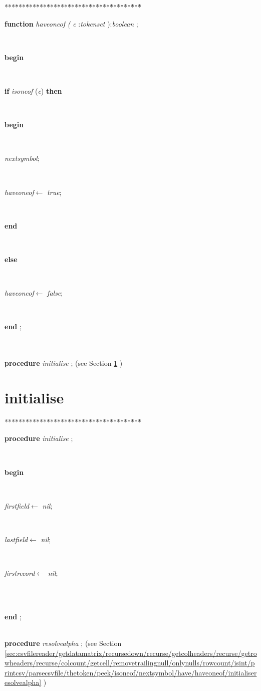 \begin{tabbing}
***\=***\=***\=***\=***\=***\=***\=***\=***\=***\=***\=***\=***\=\kill
\parbox{14cm}{\textsf{\textbf{function}  \textit{haveoneof} \textit{(} \textit{c} :\textit{tokenset} ):\textit{boolean} ;}}\\
\+\parbox{14cm}{\textsf{\textbf{begin} }}\\
\+\parbox{14cm}{\textsf {\textbf {if } \textsf{\textit{isoneof} (\textit{c})} \textbf{ then } }}\\
\<\parbox{14cm}{\textsf{\textbf{begin} }}\\
\parbox{14cm}{\textsf{\textit{nextsymbol}}; }\\
\parbox{14cm}{\textsf{\textit{haveoneof}$\leftarrow$ \textit{true}}; }\\
\<\-\parbox{14cm}{\textsf{\textbf{end} }}\\
\+\parbox{14cm}{\textsf{\textbf{else} }}\\
\-\parbox{14cm}{\textsf{\textit{haveoneof}$\leftarrow$ \textit{false}}; }\\
\<\-\parbox{14cm}{\textsf{\textbf{end} ;}}\\
\\
\+\textsf{\textbf{procedure}  \textit{initialise} ;} (see Section \ref{sec:csvfilereader/getdatamatrix/recursedown/recurse/getcolheaders/recurse/getrowheaders/recurse/colcount/getcell/removetrailingnull/onlynulls/rowcount/isint/printcsv/parsecsvfile/thetoken/peek/isoneof/nextsymbol/have/haveoneofinitialise} )\\
\end{tabbing}
\section{initialise}\label{sec:csvfilereader/getdatamatrix/recursedown/recurse/getcolheaders/recurse/getrowheaders/recurse/colcount/getcell/removetrailingnull/onlynulls/rowcount/isint/printcsv/parsecsvfile/thetoken/peek/isoneof/nextsymbol/have/haveoneofinitialise}

\begin{tabbing}
***\=***\=***\=***\=***\=***\=***\=***\=***\=***\=***\=***\=***\=\kill
\parbox{14cm}{\textsf{\textbf{procedure}  \textit{initialise} ;}}\\
\+\parbox{14cm}{\textsf{\textbf{begin} }}\\
\parbox{14cm}{\textsf{\textit{firstfield}$\leftarrow$ \textit{nil}}; }\\
\parbox{14cm}{\textsf{\textit{lastfield}$\leftarrow$ \textit{nil}}; }\\
\parbox{14cm}{\textsf{\textit{firstrecord}$\leftarrow$ \textit{nil}}; }\\
\\
\<\-\parbox{14cm}{\textsf{\textbf{end} ;}}\\
\+\textsf{\textbf{procedure}  \textit{resolvealpha} ;} (see Section \ref{sec:csvfilereader/getdatamatrix/recursedown/recurse/getcolheaders/recurse/getrowheaders/recurse/colcount/getcell/removetrailingnull/onlynulls/rowcount/isint/printcsv/parsecsvfile/thetoken/peek/isoneof/nextsymbol/have/haveoneof/initialiseresolvealpha} )\\
\end{tabbing}
